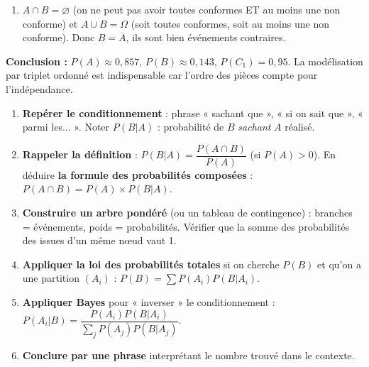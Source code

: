 \documentclass[11pt]{article}
\begin{document}
\begin{exoresolu}
\begin{enumerate}
    \begin{align*}
        P(A) &= P(C \cap C \cap C) = 0,95 \times 0,95 \times 0,95 = 0,95^3 = 0,857375. \\
        P(B) &= P(\overline{A}) = 1 - P(A) = 1 - 0,857375 = 0,142625. \\
        P(C_1) &= P(\text{1ère conforme}) = 0,95 \quad \text{(indépendance, les 2 autres n'importent pas)}.
    \end{align*}
    \item $A \cap B = \varnothing$ (on ne peut pas avoir toutes conformes ET au moins une non conforme) et $A \cup B = \Omega$ (soit toutes conformes, soit au moins une non conforme). Donc $B = \overline{A}$, ils sont bien événements contraires.
\end{enumerate}
\textbf{Conclusion :} $P(A) \approx 0,857$, $P(B) \approx 0,143$, $P(C_1)=0,95$. La modélisation par triplet ordonné est indispensable car l'ordre des pièces compte pour l'indépendance.
\end{exoresolu}

\begin{methode}
    \begin{enumerate}
        \item \textbf{Repérer le conditionnement} : phrase « sachant que », « si on sait que », « parmi les... ». Noter $P(B|A)$ : probabilité de $B$ \emph{sachant} $A$ réalisé.
        \item \textbf{Rappeler la définition} : $P(B|A) = \dfrac{P(A \cap B)}{P(A)}$ (si $P(A) > 0$). En déduire \textbf{la formule des probabilités composées} : $P(A \cap B) = P(A) \times P(B|A)$.
        \item \textbf{Construire un arbre pondéré} (ou un tableau de contingence) : branches = événements, poids = probabilités. Vérifier que la somme des probabilités des issues d'un même nœud vaut 1.
        \item \textbf{Appliquer la loi des probabilités totales} si on cherche $P(B)$ et qu'on a une partition $(A_i)$ : $P(B) = \sum P(A_i)P(B|A_i)$.
        \item \textbf{Appliquer Bayes} pour « inverser » le conditionnement : $P(A_i|B) = \dfrac{P(A_i)P(B|A_i)}{\sum_j P(A_j)P(B|A_j)}$.
        \item \textbf{Conclure par une phrase} interprétant le nombre trouvé dans le contexte.
    \end{enumerate}
\end{methode}
\end{document}
